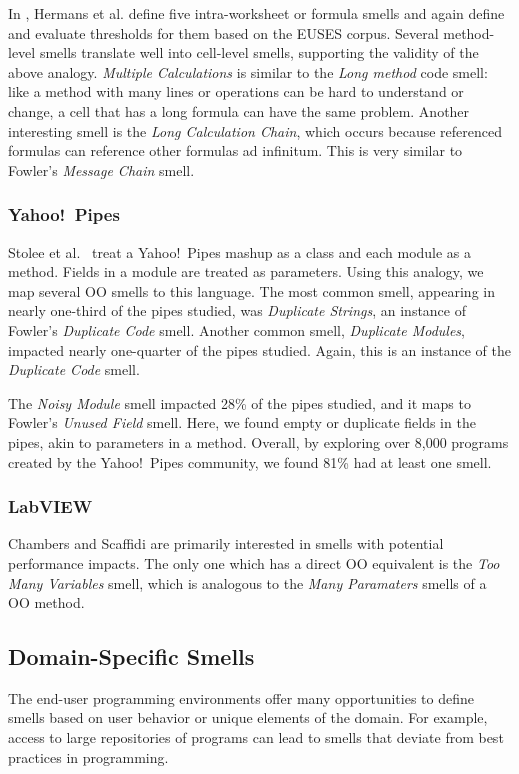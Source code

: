 \documentclass[10pt,conference,compsocconf]{IEEEtran}
\begin{document}
In \cite{Hermans2012intra}, Hermans et al. define five intra-worksheet or formula smells and again define and evaluate thresholds for them based on the EUSES corpus.
Several method-level smells translate well into cell-level smells, supporting the validity of the above analogy.
\textit{Multiple Calculations} is similar to the \textit{Long method} code smell: like a method with many lines or operations can be hard to understand or change, a cell that has a long formula can have the same problem.
Another interesting smell is the \textit{Long Calculation Chain}, which occurs because referenced formulas can reference other formulas ad infinitum.
This is very similar to Fowler's \textit{Message Chain} smell.

\subsubsection{Yahoo!\ Pipes}
Stolee et al.~\cite{Stolee2011, StoleeTSE2013} treat a Yahoo!\ Pipes mashup as a class and each module as a method.  Fields in a module are treated as parameters. Using this analogy, we map several OO smells to this language. The most common smell, appearing in nearly one-third of the pipes studied, was \emph{Duplicate Strings}, an instance of Fowler's \emph{Duplicate Code} smell. 
Another common smell, \emph{Duplicate Modules}, impacted nearly one-quarter of the pipes studied. Again, this is an instance of the \emph{Duplicate Code} smell. 

The \emph{Noisy Module} smell impacted 28\% of the pipes studied, and it maps to Fowler's \emph{Unused Field} smell. Here, we found empty or duplicate fields in the pipes, akin to parameters in a method. Overall, by exploring over 8,000 programs created by the Yahoo!\ Pipes community, we found 81\% had at least one smell. 

\subsubsection{LabVIEW}

Chambers and Scaffidi \cite{chambers2013smell} are primarily interested in smells with potential performance impacts. The only one which has a direct OO equivalent is the \emph{Too Many Variables} smell, which is analogous to the \emph{Many Paramaters} smells of a OO method.

\subsection{Domain-Specific Smells}
The end-user programming environments offer many opportunities to define smells based on user behavior or unique elements of the domain. For example, access to large repositories of programs can lead to smells that deviate from best practices in programming.
\end{document}
